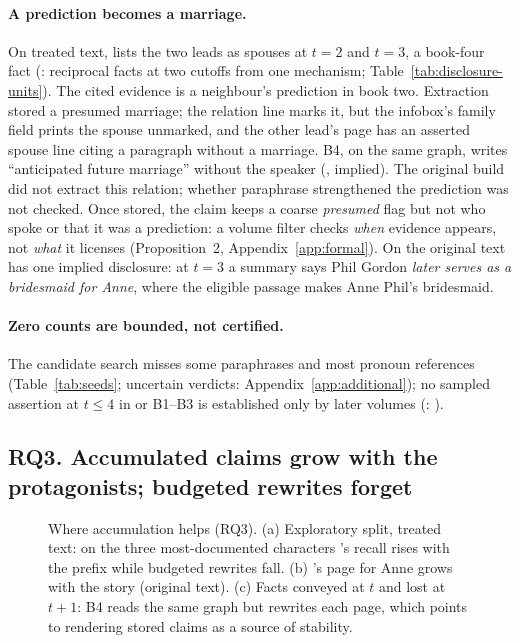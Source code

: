 \paragraph{A prediction becomes a marriage.}
On treated text, \sys lists the two leads as spouses at $t=2$ and $t=3$, a book-four fact
(: reciprocal facts at two cutoffs from one mechanism;
Table~\ref{tab:disclosure-units}). The cited evidence is a neighbour's prediction in book
two. Extraction stored a presumed marriage; the relation line marks it, but the infobox's
family field prints the spouse unmarked, and the other lead's page has an asserted spouse
line citing a paragraph without a marriage. B4, on the same graph, writes ``anticipated
future marriage'' without the speaker (, implied). The original
build did not extract this relation; whether paraphrase strengthened the prediction was
not checked. Once stored, the claim keeps a coarse \emph{presumed} flag but not who spoke
or that it was a prediction: a volume filter checks \emph{when} evidence appears, not
\emph{what} it licenses (Proposition~2, Appendix~\ref{app:formal}). On the original text
\sys has one implied disclosure: at $t=3$ a summary says Phil Gordon \emph{later serves as a
bridesmaid for Anne}, where the eligible passage makes Anne Phil's bridesmaid.

\paragraph{Zero counts are bounded, not certified.}
The candidate search misses some paraphrases and most pronoun references
(Table~\ref{tab:seeds}; uncertain verdicts: Appendix~\ref{app:additional}); no sampled
assertion at $t\le4$ in \sys or B1--B3 is established only by later volumes (\sys:
).
\subsection{RQ3. Accumulated claims grow with the protagonists; budgeted rewrites forget}
\label{sec:results-gains}

\begin{figure}[t]
\centering
\resizebox{\textwidth}{!}{}
\caption{Where accumulation helps (RQ3). (a) Exploratory split, treated text: on the three
most-documented characters \sys's recall rises with the prefix while budgeted rewrites fall.
(b) \sys's page for Anne grows with the story (original text). (c) Facts conveyed at $t$ and
lost at $t+1$: B4 reads the same graph but rewrites each page, which points to rendering
stored claims as a source of stability.}
\label{fig:accumulation}
\end{figure}

